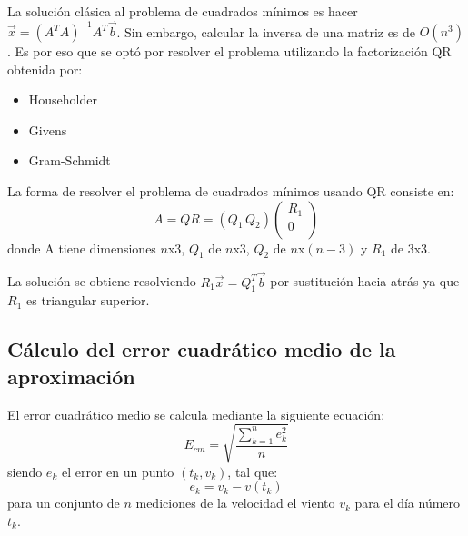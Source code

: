 \documentclass[journal, monochrome]{IEEEtran}
\begin{document}
\par
La solución clásica al problema de cuadrados mínimos es hacer $\vec{x} = (A^{T}A)^{-1}A^{T}\vec{b}$. Sin embargo, calcular la inversa de una matriz es de $O(n^{3})$. Es por eso que se optó por resolver el problema utilizando la factorización QR obtenida por:
\begin{itemize}
\item Householder
\item Givens
\item Gram-Schmidt
\end{itemize}
\par
La forma de resolver el problema de cuadrados mínimos usando QR consiste en:
\begin{equation}
A = QR = (Q_{1} \, Q_{2}) \left( \begin{array}{c}
R_{1} \\
0 \\
\end{array} \right)
\end{equation}
donde A tiene dimensiones $n$x$3$, $Q_{1}$ de $n$x$3$, $Q_{2}$ de $n$x$(n-3)$ y $R_{1}$ de $3$x$3$.
\par
La solución se obtiene resolviendo $R_{1}\vec{x} = Q_{1}^{T}\vec{b} $ por sustitución hacia atrás ya que $R_{1}$ es triangular superior.

\subsection{Cálculo del error cuadrático medio de la aproximación}
\par
El error cuadrático medio se calcula mediante la siguiente ecuación:
\begin{equation}
 E_{cm} = \sqrt{\frac{\sum_{k=1}^n e_k^2}{n}}
\end{equation}
siendo $e_k$ el error en un punto $(t_k, v_k)$, tal que:
\begin{equation}
 e_k = v_k - v(t_k)
\end{equation}
para un conjunto de $n$ mediciones de la velocidad el viento $v_k$ para el día número $t_k$.
\end{document}
